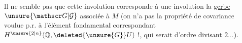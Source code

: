 Il ne semble pas que cette involution corresponde
à une involution  la \uline{gerbe} $\unsure{\mathscr G|\mathcal G}$ associée à
$M$ (on  n'a pas la propriété de
covariance voulue p.r. à l'élément fondamental
correspondant  $H^{\unsure{2|n}}(\mathbb Q,\deleted{\unsure{G}}U)$ !, qui
serait  d'ordre divisant $2\ldots$).

